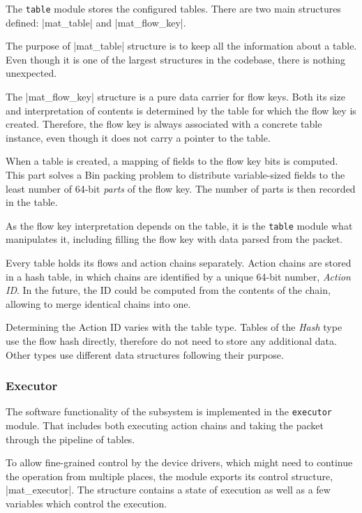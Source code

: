 The \texttt{table} module stores the configured tables. There are two main
structures defined: \struct|mat_table| and \struct|mat_flow_key|.

The purpose of \struct|mat_table| structure is to keep all the information
about a table. Even though it is one of the largest structures in the codebase,
there is nothing unexpected.

The \struct|mat_flow_key| structure is a pure data carrier for flow keys. Both
its size and interpretation of contents is determined by the table for which the
flow key is created. Therefore, the flow key is always associated with
a concrete table instance, even though it does not carry a pointer to the table.

When a table is created, a mapping of fields to the flow key bits is computed.
This part solves a Bin packing problem to distribute variable-sized fields to
the least number of 64-bit \emph{parts} of the flow key. The number of parts is
then recorded in the table.

As the flow key interpretation depends on the table, it is the \texttt{table}
module what manipulates it, including filling the flow key with data parsed
from the packet.

Every table holds its flows and action chains separately. Action chains are
stored in a hash table, in which chains are identified by a unique 64-bit
number, \emph{Action ID}. In the future, the ID could be computed from the
contents of the chain, allowing to merge identical chains into one.

Determining the Action ID varies with the table type. Tables of the \emph{Hash}
type use the flow hash directly, therefore do not need to store any additional
data. Other types use different data structures following their purpose.

\subsubsection{Executor}

The software functionality of the subsystem is implemented in the
\texttt{executor} module. That includes both executing action chains and
taking the packet through the pipeline of tables.

To allow fine-grained control by the device drivers, which might need to
continue the operation from multiple places, the module exports its control
structure, \struct|mat_executor|. The structure contains a state of execution
as well as a few variables which control the execution.

